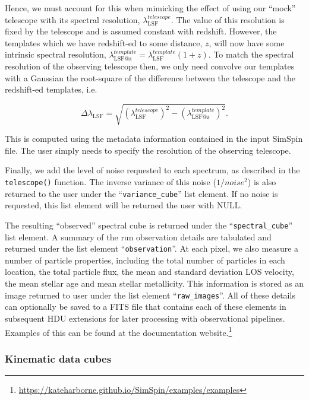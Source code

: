 \documentclass[
  journal=pasa,
  manuscript=research-paper, %
  year=2020,
  volume=37,
]{cup-journal}
\newcommand{\telescope}[1]{\texttt{telescope()}#1}
\begin{document}
Hence, we must account for this when mimicking the effect of using our ``mock'' telescope with its spectral resolution, $\lambda_{\text{LSF}}^{telescope}$.
The value of this resolution is fixed by the telescope and is assumed constant with redshift. 
However, the templates which we have redshift-ed to some distance, $z$, will now have some intrinsic spectral resolution, $\lambda_{\text{LSF@z}}^{template} = \lambda_{\text{LSF}}^{template} (1 + z)$.
To match the spectral resolution of the observing telescope then, we only need convolve our templates with a Gaussian the root-square of the difference between the telescope and the redshift-ed templates, i.e. 

\begin{equation}
\Delta \lambda_{\text{LSF}} = \sqrt{(\lambda_{\text{LSF}}^{telescope})^2 - (\lambda_{\text{LSF@z}}^{template})^2}.
\label{eq:LSF}
\end{equation}

This is computed using the metadata information contained in the input SimSpin file. 
The user simply needs to specify the resolution of the observing telescope. 

Finally, we add the level of noise requested to each spectrum, as described in the \telescope{} function. 
The inverse variance of this noise ($1/noise^{2}$) is also returned to the user under the ``\texttt{variance\_cube}'' list element.
If no noise is requested, this list element will be returned the user with NULL. 

The resulting ``observed'' spectral cube is returned under the ``\texttt{spectral\_cube}'' list element. 
A summary of the run observation details are tabulated and returned under the list element ``\texttt{observation}''. 
At each pixel, we also measure a number of particle properties, including the total number of particles in each location, the total particle flux, the mean and standard deviation LOS velocity, the mean stellar age and mean stellar metallicity.  
This information is stored as an image returned to user under the list element ``\texttt{raw\_images}''.
All of these details can optionally be saved to a FITS file that contains each of these elements in subsequent HDU extensions for later processing with observational pipelines. 
Examples of this can be found at the documentation website.\footnote{\url{https://kateharborne.github.io/SimSpin/examples/examples}}

\subsubsection{Kinematic data cubes}
\label{sec:velocity_cubes}
\end{document}
